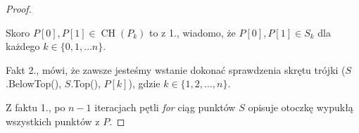 \begin{theorem}
\begin{proof}
\begin{enumerate}
\begin{enumerate}
			\end{enumerate}
			Skoro $P[0], P[1] \in \operatorname{CH}(P_k)$ to z 1., wiadomo, że $P[0], P[1] \in S_k$ dla każdego $k \in \{0, 1, \ldots n\}$.
			
		\end{enumerate}
		
		Fakt 2., mówi, że zawsze jesteśmy wstanie dokonać sprawdzenia 
		skrętu trójki ($S$.BelowTop(), $S$.Top(), $P[k]$), gdzie $k \in
		\{1, 2, \ldots, n\}$.
		
		Z faktu 1., po $n-1$ iteracjach pętli \textit{for} ciąg punktów $S$ opisuje otoczkę wypukłą wszystkich punktów z $P$. 
	\end{proof}
\end{theorem}

